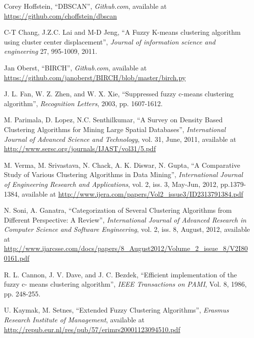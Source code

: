 \documentclass[conference, 10pt]{IEEEtran}
\begin{document}
\begin{thebibliography}{1}
 Corey Hoffstein, ``DBSCAN'', \emph{Github.com}, available at
\url{https://github.com/choffstein/dbscan}

 C-T Chang, J.Z.C. Lai and M-D Jeng, ``A Fuzzy K-means clustering algorithm  using cluster center displacement'', \emph{Journal of information science and engineering} 27, 995-1009, 2011.

 Jan Oberst, ``BIRCH'', \emph{Github.com}, available at
\url{https://github.com/janoberst/BIRCH/blob/master/birch.py}

 J. L. Fan, W. Z. Zhen, and W. X. Xie, ``Suppressed fuzzy c-means clustering algorithm'', \emph{ Recognition Letters}, 2003, pp. 1607-1612.

 M. Parimala, D. Lopez, N.C. Senthilkumar, ``A Survey on Density Based Clustering Algorithms for Mining Large Spatial Databases'', \emph{International Journal of Advanced Science and Technology}, vol. 31, June, 2011, available at
\url{http://www.sersc.org/journals/IJAST/vol31/5.pdf}

 M. Verma, M. Srivastava, N. Chack, A. K. Diswar, N. Gupta, ``A Comparative Study of Various Clustering Algorithms in Data Mining'', \emph{International Journal of Engineering Research and Applications}, vol. 2, iss. 3, May-Jun, 2012, pp.1379-1384, available at
\url{http://www.ijera.com/papers/Vol2_issue3/ID2313791384.pdf}

 N. Soni, A. Ganatra, ``Categorization of Several Clustering Algorithms from Different Perspective: A Review'', \emph{International Journal of Advanced Research in Computer Science and Software Engineering}, vol. 2, iss. 8, August, 2012, available at
\url{http://www.ijarcsse.com/docs/papers/8_August2012/Volume_2_issue_8/V2I800161.pdf}

 R. L. Cannon, J. V. Dave, and J. C. Bezdek, ``Efficient implementation of the fuzzy c- means clustering algorithm'', \emph{IEEE Transactions on PAMI}, Vol. 8, 1986, pp. 248-255.

 U. Kaymak, M. Setnes, ``Extended Fuzzy Clustering Algorithms'', \emph{Erasmus Research Institute of Management}, available at
\url{http://repub.eur.nl/res/pub/57/erimrs20001123094510.pdf}

\end{thebibliography}

\end{document}
